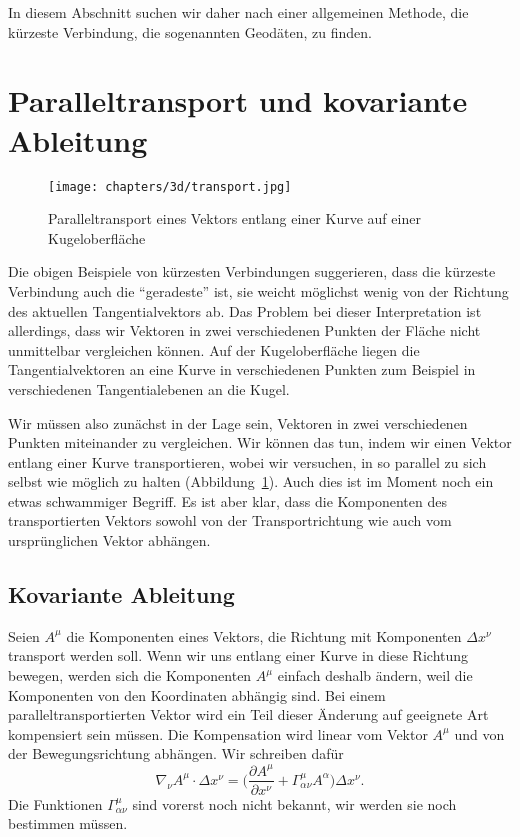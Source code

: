 In diesem Abschnitt suchen wir daher nach einer allgemeinen Methode,
die kürzeste Verbindung, die sogenannten Geodäten, zu finden.

\section{Paralleltransport und kovariante Ableitung}
\begin{figure}
\centering
\texttt{[image: chapters/3d/transport.jpg]}
\caption{Paralleltransport eines Vektors entlang einer Kurve auf
einer Kugeloberfläche%
\label{skript:geodaten:fig:transport}}
\end{figure}
%
%
%
Die obigen Beispiele von kürzesten Verbindungen suggerieren, dass die kürzeste
Verbindung auch die ``geradeste'' ist, sie weicht möglichst wenig von
der Richtung des aktuellen Tangentialvektors ab.
Das Problem bei dieser Interpretation ist allerdings, dass wir Vektoren
in zwei verschiedenen Punkten der Fläche nicht unmittelbar vergleichen
können.
Auf der Kugeloberfläche liegen die Tangentialvektoren an eine Kurve in
verschiedenen Punkten zum Beispiel in verschiedenen Tangentialebenen
an die Kugel.

Wir müssen also zunächst in der Lage sein, Vektoren in zwei verschiedenen
Punkten miteinander zu vergleichen.
Wir können das tun, indem wir einen Vektor entlang einer Kurve transportieren,
wobei wir versuchen, in so parallel zu sich selbst wie möglich
zu halten (Abbildung~\ref{skript:geodaten:fig:transport}).
Auch dies ist im Moment noch ein etwas schwammiger Begriff. 
Es ist aber klar, dass die Komponenten des transportierten Vektors
sowohl von der Transportrichtung wie auch vom ursprünglichen Vektor
abhängen.

\subsection{Kovariante Ableitung}
Seien $A^\mu$ die Komponenten eines Vektors, die Richtung mit Komponenten
$\Delta x^\nu$ transport werden soll.
Wenn wir uns entlang einer Kurve in diese Richtung bewegen, werden sich
die Komponenten $A^\mu$ einfach deshalb ändern, weil die Komponenten von
den Koordinaten abhängig sind.
Bei einem paralleltransportierten Vektor wird ein Teil dieser Änderung
auf geeignete Art kompensiert sein müssen.
Die Kompensation wird linear vom Vektor $A^\mu$ und von der
Bewegungsrichtung abhängen.
Wir schreiben dafür
\[
\nabla_\nu A^\mu\cdot \Delta x^\nu
=
\biggl(\frac{\partial A^\mu}{\partial x^\nu}
+
\Gamma^\mu_{\alpha\nu}A^\alpha\biggr)\Delta x^\nu.
\]
Die Funktionen $\Gamma^\mu_{\alpha\nu}$ sind vorerst noch nicht bekannt,
wir werden sie noch bestimmen müssen.

